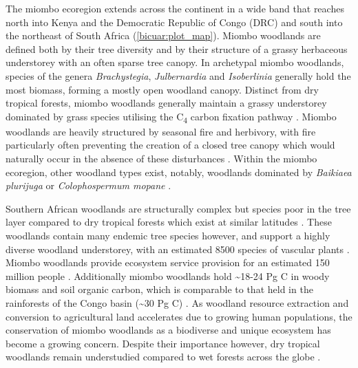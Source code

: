 \begin{refsection}
The miombo ecoregion extends across the continent in a wide band that reaches north into Kenya and the Democratic Republic of Congo (DRC) and south into the northeast of South Africa (\autoref{bicuar:plot_map}). Miombo woodlands are defined both by their tree diversity and by their structure of a grassy herbaceous understorey with an often sparse tree canopy. In archetypal miombo woodlands, species of the genera \textit{Brachystegia}, \textit{Julbernardia} and \textit{Isoberlinia} generally hold the most biomass, forming a mostly open woodland canopy. Distinct from dry tropical forests, miombo woodlands generally maintain a grassy understorey dominated by grass species utilising the C\textsubscript{4} carbon fixation pathway \citep{Dexter2015}. Miombo woodlands are heavily structured by seasonal fire and herbivory, with fire particularly often preventing the creation of a closed tree canopy which would naturally occur in the absence of these disturbances \citep{Oliveras2016, Dantas2016}. Within the miombo ecoregion, other woodland types exist, notably, woodlands dominated by \textit{Baikiaea plurijuga} or \textit{Colophospermum mopane} \citep{Campbell2002}.

Southern African woodlands are structurally complex but species poor in the tree layer compared to dry tropical forests which exist at similar latitudes \citep{DRYFLOR2016, Torello-raventos2013}. These woodlands contain many endemic tree species however, and support a highly diverse woodland understorey, with an estimated 8500 species of vascular plants \citep{Frost1996}. Miombo woodlands provide ecosystem service provision for an estimated 150 million people \citep{Ryan2016}. Additionally miombo woodlands hold \textasciitilde{}18-24 Pg C in woody biomass and soil organic carbon, which is comparable to that held in the rainforests of the Congo basin (\textasciitilde{}30 Pg C) \citep{Mayaux2008}. As woodland resource extraction and conversion to agricultural land accelerates due to growing human populations, the conservation of miombo woodlands as a biodiverse and unique ecosystem has become a growing concern. Despite their importance however, dry tropical woodlands remain understudied compared to wet forests across the globe \citep{Clarke2017}. 


\end{refsection}
